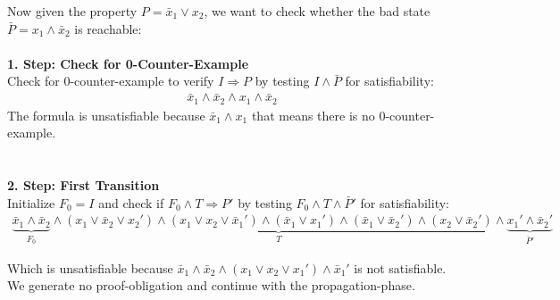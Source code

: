 \documentclass[11pt, a4paper, BCOR=10mm, ngerman, oneside]{scrbook}
\begin{document}
Now given the property $P = \bar x_1 \lor x_2$, we want to check whether the bad state $\bar P = x_1 \land \bar x_2$ is reachable: \\ \\

\textbf{1. Step: Check for 0-Counter-Example} \\ 
Check for 0-counter-example to verify $I \Rightarrow P$ by testing $I \land \bar P$ for satisfiability: 
\begin{align*}
\bar x_1 \land \bar x_2 \land x_1 \land \bar x_2
\end{align*}
The formula is unsatisfiable because $\bar x_1 \land x_1$ that means there is no 0-counter-example. \\ \\ \\

\textbf{2. Step: First Transition} \\
Initialize $F_0 = I$ and check if $F_0 \land T \Rightarrow P'$ by testing $F_0 \land T \land \bar P'$ for satisfiability:
\begin{align*}
\underbrace{\bar x_1 \land \bar x_2}_{F_0} \land \underbrace{( x_1 \lor \bar x_2 \lor x_2') \land (x_1 \lor x_2 \lor \bar x_1') \land (\bar x_1 \lor x_1') \land (\bar x_1 \lor \bar x_2') \land (x_2 \lor \bar x_2')}_{T} \land \underbrace{x_1' \land \bar x_2'}_{\bar P'}
\end{align*}

Which is unsatisfiable because $\bar x_1 \land \bar x_2 \land (x_1 \lor x_2 \lor x_1') \land \bar x_1'$ is not satisfiable. We generate no proof-obligation and continue with the propagation-phase. \\ \\ \\
\end{document}
